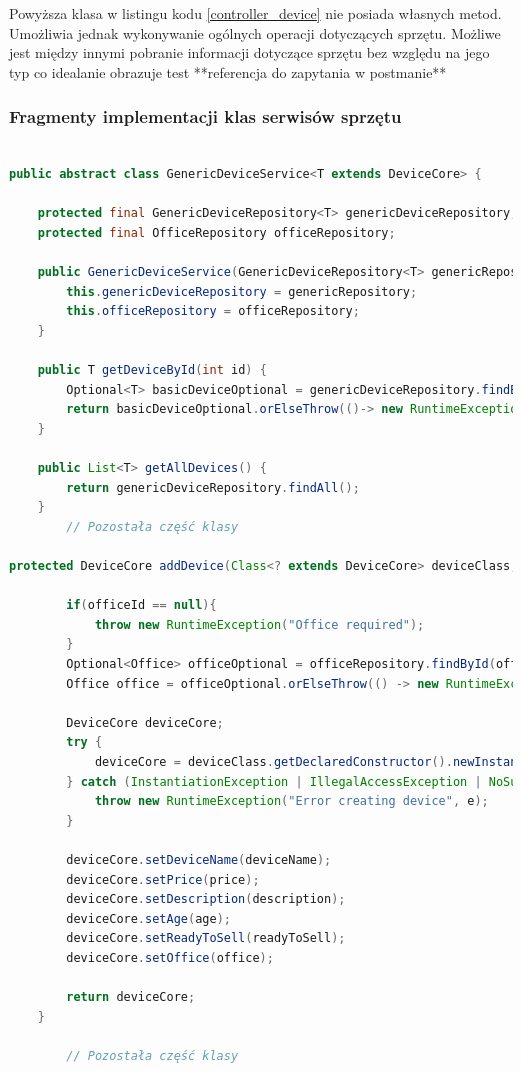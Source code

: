 Powyższa klasa w listingu kodu \ref{controller_device} nie posiada własnych metod. Umożliwia jednak wykonywanie ogólnych operacji dotyczących sprzętu. Możliwe jest między innymi pobranie informacji dotyczące sprzętu bez względu na jego typ co idealanie obrazuje test **referencja do zapytania w postmanie**


\subsubsection{Fragmenty implementacji klas serwisów sprzętu}


\begin{lstlisting}[language=Java, style=JavaStyle,  caption={Klasa nadrzędna serwisu sprzętu GenericDeviceService}, label={service_tablet}]

public abstract class GenericDeviceService<T extends DeviceCore> {

    protected final GenericDeviceRepository<T> genericDeviceRepository;
    protected final OfficeRepository officeRepository;

    public GenericDeviceService(GenericDeviceRepository<T> genericRepository, OfficeRepository officeRepository) {
        this.genericDeviceRepository = genericRepository;
        this.officeRepository = officeRepository;
    }

    public T getDeviceById(int id) {
        Optional<T> basicDeviceOptional = genericDeviceRepository.findById(id);
        return basicDeviceOptional.orElseThrow(()-> new RuntimeException("Device not found with id: " + id));
    }

    public List<T> getAllDevices() {
        return genericDeviceRepository.findAll();
    }
		// Pozostała część klasy

protected DeviceCore addDevice(Class<? extends DeviceCore> deviceClass, String deviceName, Double price, String description, Integer age, Boolean readyToSell, Integer officeId) {

        if(officeId == null){
            throw new RuntimeException("Office required");
        }
        Optional<Office> officeOptional = officeRepository.findById(officeId);
        Office office = officeOptional.orElseThrow(() -> new RuntimeException("Office not found with id: " + officeId));

        DeviceCore deviceCore;
        try {
            deviceCore = deviceClass.getDeclaredConstructor().newInstance();
        } catch (InstantiationException | IllegalAccessException | NoSuchMethodException | InvocationTargetException e) {
            throw new RuntimeException("Error creating device", e);
        }

        deviceCore.setDeviceName(deviceName);
        deviceCore.setPrice(price);
        deviceCore.setDescription(description);
        deviceCore.setAge(age);
        deviceCore.setReadyToSell(readyToSell);
        deviceCore.setOffice(office);

        return deviceCore;
    }
		
		// Pozostała część klasy

\end{lstlisting}
